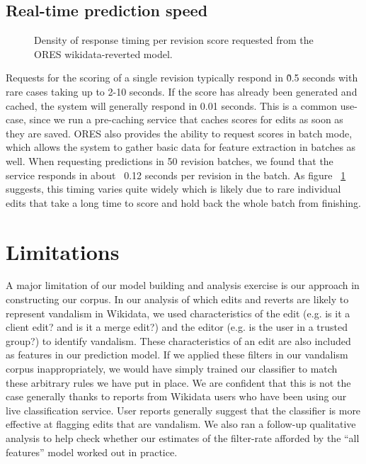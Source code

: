 \documentclass{sig-alternate-2013}
\begin{document}
\subsection{Real-time prediction speed}
\begin{figure}
\centering
{}
\caption{Density of response timing per revision score requested from the ORES wikidata-reverted model.}
\label{fig:ores_response}
\end{figure}
Requests for the scoring of a single revision typically respond in \~0.5 seconds with rare cases taking up to 2-10 seconds.  If the score has already been generated and cached, the system will generally respond in 0.01 seconds.  This is a common use-case, since we run a pre-caching service that caches scores for edits as soon as they are saved.  ORES also provides the ability to request scores in batch mode, which allows the system to gather basic data for feature extraction in batches as well.  When requesting predictions in 50 revision batches, we found that the service responds in about ~0.12 seconds per revision in the batch.  As figure ~\ref{fig:ores_response} suggests, this timing varies quite widely which is likely due to rare individual edits that take a long time to score and hold back the whole batch from finishing.

\section{Limitations}

A major limitation of our model building and analysis exercise is our approach in constructing our corpus. In our analysis of which edits and reverts are likely to represent vandalism in Wikidata, we used characteristics of the edit (e.g. is it a client edit? and is it a merge edit?) and the editor (e.g. is the user in a trusted group?) to identify vandalism. These characteristics of an edit are also included as features in our prediction model. If we applied these filters in our vandalism corpus inappropriately, we would have simply trained our classifier to match these arbitrary rules we have put in place. We are confident that this is not the case generally thanks to reports from Wikidata users who have been using our live classification service. User reports generally suggest that the classifier is more effective at flagging edits that are vandalism. We also ran a follow-up qualitative analysis to help check whether our estimates of the filter-rate afforded by the ``all features'' model worked out in practice.
\end{document}
